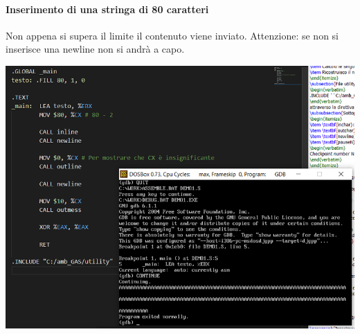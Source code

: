\documentclass[11pt]{report}
\begin{document}
\paragraph{Inserimento di una stringa di 80 caratteri} Non appena si supera il limite il contenuto viene inviato. Attenzione: se non si inserisce una newline non si andrà a capo.
\begin{center}
\includegraphics{img/220.PNG}
\end{center}
\end{document}
